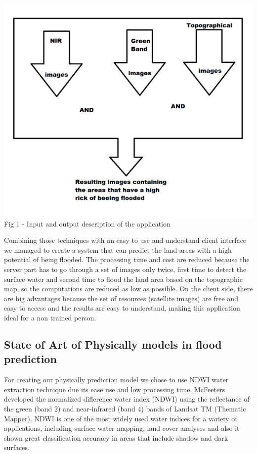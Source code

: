 \documentclass[12pt, a4paper]{report}
\begin{document}
\begin{center}
	\includegraphics[scale=0.6]{application_outline.png} 
	Fig 1 - Input and output description of the application
\end{center}

Combining those techniques with an easy to use and understand client interface we managed to create a system that can predict the land areas with a high potential of being flooded. The processing time and cost are reduced because the server part has to go through a set of images only twice, first time to detect the surface water and second time to flood the land area based on the topographic map, so the computations are reduced as low as possible. On the client side, there are big advantages because the set of resources (satellite images) are free and easy to access and the results are easy to understand, making this application ideal for a non trained person.
\par





\subsection{State of Art of Physically models in flood prediction}

\quad
For creating our physically prediction model we chose to use NDWI water extraction technique due its ease use and low processing time. McFeeters \cite{McFeeters} developed the normalized difference water index (NDWI) using the reflectance of the green (band 2) and near-infrared (band 4) bands of Landsat TM (Thematic Mapper). NDWI is one of the most widely used water indices for a variety of applications, including surface water mapping, land cover analyses \cite{Duan, Poulin, Hui} and also it shown great classification accuracy in areas that include shadow and dark surfaces.
\par 
\end{document}

